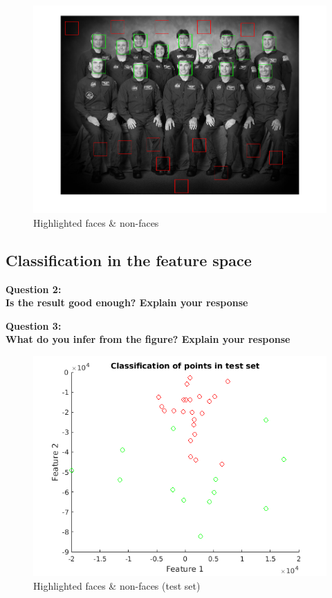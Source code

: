 \begin{figure}[h!tb]
	\centering
		\includegraphics[width=\textwidth]{./img/ex1/facesandnonfaceshighlighted.png}
	\caption{Highlighted faces \& non-faces}
	\label{fig:facesandnonfaceshighlighted}
\end{figure}


\subsection{Classification in the feature space}

{\bfseries Question 2: \\Is the result good enough? Explain your response}

{\bfseries Question 3: \\What do you infer from the figure? Explain your response}

\begin{figure}[h!tb]
	\centering
		\includegraphics[width=\textwidth]{./img/ex1/feattestscatter.png}
	\caption{Highlighted faces \& non-faces (test set)}
	\label{fig:feattestscatter}
\end{figure}

